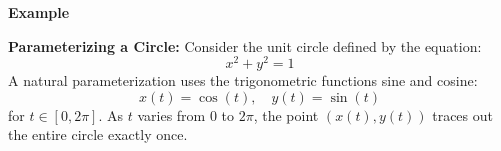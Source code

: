 \textbf{Example}
\vspace{\baselineskip}

\textbf{Parameterizing a Circle:}  
Consider the unit circle defined by the equation:
\[
x^2 + y^2 = 1
\]
A natural parameterization uses the trigonometric functions sine and cosine:
\[
x(t) = \cos(t), \quad y(t) = \sin(t)
\]
for \( t \in [0, 2\pi] \).  
As \( t \) varies from \( 0 \) to \( 2\pi \), the point \( (x(t), y(t)) \) traces out the entire circle exactly once.
